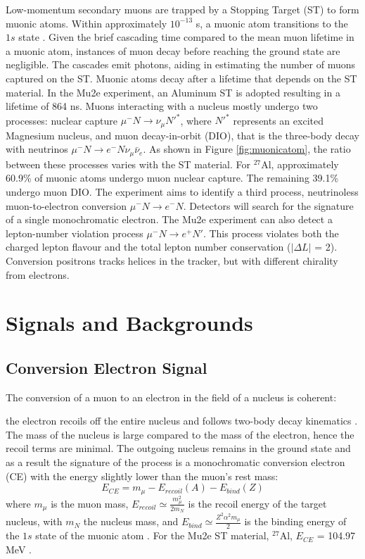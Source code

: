 Low-momentum secondary muons are trapped by a Stopping Target (ST) to form muonic atoms. 
Within approximately $10^{-13}$ s, 
a muonic atom transitions to the $1s$ state \cite{MEASDAY2001243}. 
Given the brief cascading time compared to the mean muon lifetime in a muonic atom,  
instances of muon decay before reaching the ground state are negligible. 
The cascades emit photons, aiding in estimating the number of muons captured 
on the ST. 
Muonic atoms decay after a lifetime that depends on the ST material. 
In the Mu2e experiment, an Aluminum ST is adopted resulting in a lifetime of 
864 ns. Muons interacting with a nucleus mostly undergo two processes: 
nuclear capture $\mu^- N \rightarrow \nu_\mu N'^* $, where $N'^*$ represents an excited 
Magnesium nucleus, and muon decay-in-orbit (DIO), 
that is the three-body decay with neutrinos $\mu ^- N \rightarrow e^- N \nu_\mu \bar{\nu}_e$. 
As shown in Figure \ref{fig:muonicatom}, the ratio between these 
processes varies with the ST material. For $^{27}$Al, approximately 60.9\% 
of muonic atoms undergo muon nuclear capture. The remaining 39.1\% undergo muon DIO. 
The experiment aims to identify a third process, neutrinoless muon-to-electron 
conversion $\mu^- N \rightarrow e^- N $. Detectors will search for the signature of a 
single monochromatic electron.
The Mu2e experiment can also detect a lepton-number violation process 
$\mu^- N \rightarrow e^+ N'$.
This process violates both the charged lepton flavour and the total lepton number 
conservation ($|\Delta L|$ = 2). 
Conversion positrons tracks helices in the tracker, but with different chirality from electrons. 
\section{Signals and Backgrounds}\label{sigandbkg}
\subsection{Conversion Electron Signal}
{\red The conversion of a muon to an electron in the field of a nucleus is coherent: }


the electron recoils off the entire nucleus and follows two-body decay kinematics \cite{bartoszek2015mu2e}. The mass of the nucleus is large compared to the 
mass of the electron, hence the recoil terms are minimal. The outgoing nucleus 
remains in the ground state and as a result the signature of the process is a monochromatic conversion electron 
(CE) with the energy slightly lower than the muon's rest mass:
\begin{equation}
    E_{CE} = m_\mu - E_{recoil}(A) - E_{bind}(Z) 
\end{equation}
where $m_\mu$ is the muon mass, $E_{recoil}\simeq \frac{m^2_\mu}{2 m_N}$ is 
the recoil energy of the target nucleus, with $m_N$ the nucleus mass, and 
$E_{bind}\simeq \frac{Z^2 \alpha^2 m_\mu}{2}$ is the binding energy of the 
$1s$ state of the muonic atom \cite{universe9010054}. For the Mu2e 
ST material, $^{27}$Al, $E_{CE}$ = 104.97 MeV \cite{PhysRevD.84.013006}.
